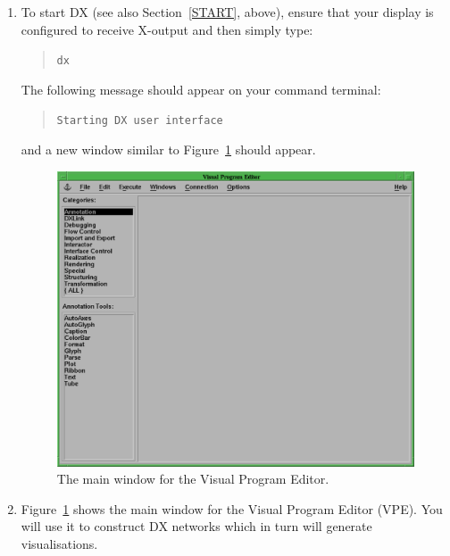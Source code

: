 \documentclass[twoside,11pt]{article}
\begin{document}
\begin{enumerate}

  \item To start DX (see also Section~\ref{START}, above), ensure that
   your display is configured to receive X-output and then simply type:

  \begin{quote}
   {\tt dx}
  \end{quote}

   The following message should appear on your command terminal:

  \begin{quote}
   {\tt Starting DX user interface}
  \end{quote}

   and a new window similar to Figure~\ref{VPE} should appear.

  \begin{figure}[htbp]
  \label{VPE}

  \begin{center}
  \leavevmode
  \includegraphics[width=450pt]{sc2_vpe}
  \end{center}

  \caption[The main window for the Visual Program Editor.]{The main
   window for the Visual Program Editor.}

  \end{figure}

  \item Figure~\ref{VPE} shows the main window for the Visual Program
   Editor (VPE). You will use it to construct DX networks which in turn
   will generate visualisations.


\end{enumerate}
\end{document}
